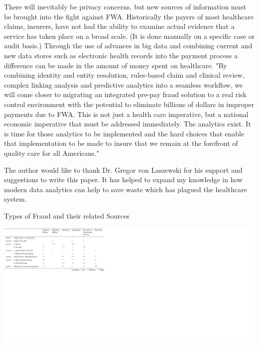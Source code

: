 \documentclass[sigconf]{acmart}
\begin{document}
There will inevitably be privacy concerns, but new sources of information must be brought into the fight against FWA.  Historically the payers of most healthcare claims, insurers, have not had the ability to examine actual evidence that a service has taken place on a broad scale.  (It is done manually on a specific case or audit basis.)  Through the use of advances in big data and combining current and new data stores such as electronic health records into the payment process a difference can be made in the amount of money spent on healthcare.  "By combining identity and entity resolution, rules-based claim and clinical review, complex linking analysis and predictive analytics into a seamless workflow, we will come closer to migrating an integrated pre-pay fraud solution to a real risk control environment with the potential to eliminate billions of dollars in improper payments due to FWA. This is not just a health care imperative, but a national economic imperative that must be addressed immediately. The analytics exist. It is time for those analytics to be implemented and the hard choices that enable that implementation to be made to insure that we remain at the forefront of quality care for all Americans."\cite{LexisNexis}

\begin{acks}

  The author would like to thank Dr. Gregor von Laszewski for his
  support and suggestions to write this paper.  It has helped to expand my knowledge in how modern data analytics can help to save waste which has plagued the healthcare system.

\end{acks}


 

\begin{table}[htb]
    \caption{Types of Fraud and their related Sources\cite{THORNTON20131252}}
    \label{fig:TypesofFraud}
    \includegraphics[scale=0.60]{images/TypesofFraud.png}
\end{table}
\end{document}
